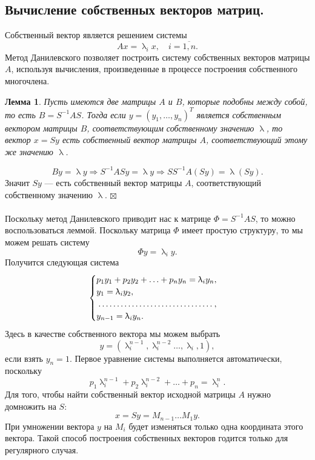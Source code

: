 \documentclass[a4paper, 12pt]{report}
\newenvironment{Proof} %
{\par\noindent{$\blacklozenge$}} %
{\hfill$\scriptstyle\boxtimes$}
\renewcommand{\lambda}{\uplambda}
\newtheorem*{lem}{Лемма}
\begin{document}
	 \subsection{Вычисление собственных векторов матриц.}
	 Собственный вектор является решением системы $$Ax = \lambda_i x,\quad i = \overline{1,n}.$$
	 Метод Данилевского позволяет построить систему собственных векторов матрицы $A$, используя вычисления, произведенные в процессе построения собственного многочлена. 
	 \begin{lem}
	 	Пусть имеются две матрицы $A$ и $B$, которые подобны между собой, то есть $B = S^{-1}AS$. Тогда если $y = (y_1,\ldots, y_n)^T$ является собственным вектором матрицы $B$, соответствующим собственному значению $\lambda$, то вектор $x = Sy$ есть собственный вектор матрицы $A$, соответствующий этому же значению $\lambda$.
	 \end{lem}\begin{Proof}
	 $$By = \lambda y \Rightarrow S^{-1}ASy = \lambda y\Rightarrow SS^{-1}A(Sy) = \lambda (Sy).$$
	 Значит $Sy$ --- есть собственный вектор матрицы $A$, соответствующий собственному значению $\lambda$.
	 \end{Proof}\\\\
	 Поскольку метод Данилевского приводит нас к матрице $\Phi = S^{-1}AS$, то можно воспользоваться леммой. Поскольку матрица $\Phi$ имеет простую структуру, то мы можем решать систему $$\Phi y = \lambda_i y.$$
	 Получится следующая система $$\begin{cases}
	 p_1y_1 + p_2y_2 + \ldots + p_ny_n = \lambda_iy_n,\\
	 y_1 = \lambda_i y_2,\\
	 \dotfill,\\
	 y_{n-1} = \lambda_iy_n.
	 \end{cases}$$
	 Здесь в качестве собственного вектора мы можем выбрать $$y = (\lambda_i^{n-1}, \lambda_i^{n-2}\ldots, \lambda_i,1),$$
	 если взять $y_n = 1$. Первое уравнение системы выполняется автоматически, поскольку $$p_1\lambda_i^{n-1} + p_2\lambda_i^{n-2} + \ldots + p_n = \lambda_i^n.$$
	 Для того, чтобы найти собственный вектор исходной матрицы $A$ нужно домножить на $S$:$$x = Sy =M_{n-1}\ldots M_1y.$$
	 При умножении вектора $y$ на $M_i$ будет изменяться только одна координата этого вектора. Такой способ построения собственных векторов годится только для регулярного случая.
\end{document}
